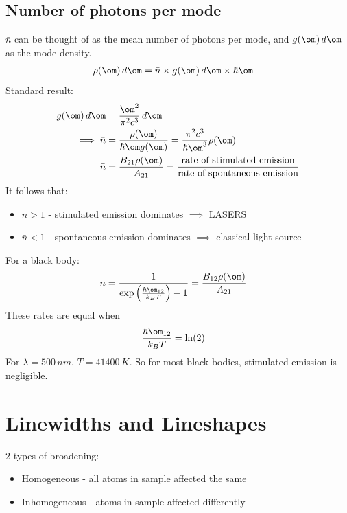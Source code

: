 \documentclass[a4paper, 11pt, normalem]{report}
\begin{document}
\section{Number of photons per mode}
$\bar{n}$ can be thought of as the mean number of photons per mode, and $g(\om)\,d\om$ as the mode density. 
\begin{align}
    \rho(\om)\,d\om &= \bar{n} \times g(\om)\,d\om \times \hbar\om
\end{align}
Standard result:
\begin{align}
    g(\om)\,d\om &= \frac{\om^2}{\pi^2c^3}\,d\om \\
    \implies \bar{n} &= \frac{\rho(\om)}{\hbar\om g(\om)} = \frac{\pi^2c^3}{\hbar\om^3}\rho(\om)\\
    \bar{n} &= \frac{B_{21}\rho(\om)}{A_{21}} = \frac{\text{rate of stimulated emission}}{\text{rate of spontaneous emission}}
\end{align}
It follows that:
\begin{itemize}
    \item $\bar{n}>1$ - stimulated emission dominates $\implies$ LASERS
    \item $\bar{n}<1$ - spontaneous emission dominates $\implies$ classical light source
\end{itemize}
For a black body:
\begin{align}
    \bar{n} &= \frac{1}{\exp\left(\frac{\hbar\om_{12}}{k_BT}\right) -1} = \frac{B_{12}\rho(\om)}{A_{21}}
\end{align}
These rates are equal when
\begin{align}
    \frac{\hbar\om_{12}}{k_BT} &= \ln(2)
\end{align}
For $\lambda=500\,nm$, $T= 41400\,K$. So for most black bodies, stimulated emission is negligible.

\chapter{Linewidths and Lineshapes}
2 types of broadening:
\begin{itemize}
    \item Homogeneous - all atoms in sample affected the same
    \item Inhomogeneous - atoms in sample affected differently
\end{itemize}
\end{document}
